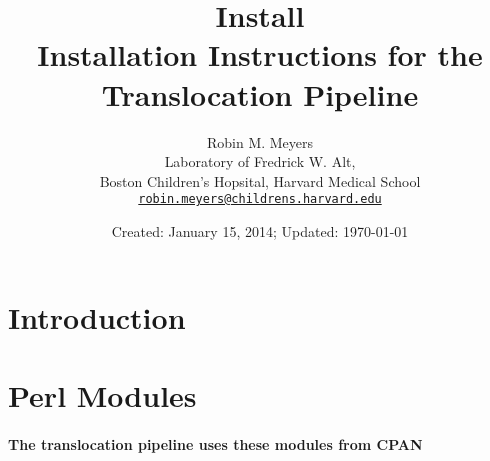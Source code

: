 \documentclass{article}
\begin{document}
\title{Install \\ \large Installation Instructions for the Translocation Pipeline}
\author{Robin M. Meyers\\
  Laboratory of Fredrick W. Alt,\\
  Boston Children's Hopsital, Harvard Medical School\\
  \href{mailto:robin.meyers@childrens.harvard.edu}{\texttt{robin.meyers@childrens.harvard.edu}}}
\date{Created: January 15, 2014; Updated: \today}
\maketitle

\begin{abstract}
\end{abstract}

\section{Introduction}
\paragraph{}

\section{Perl Modules}
\paragraph{The translocation pipeline uses these modules from CPAN}
\item
\end{document}
